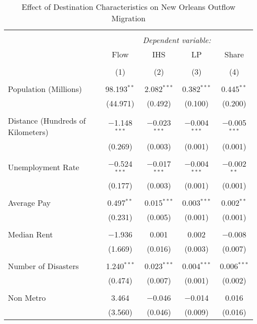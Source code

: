 \documentclass[]{article}
\begin{document}
\clearpage

\clearpage
\scriptsize

\begin{table}[!htbp] \centering 
  \caption{\label{reg:regmain}Effect of Destination Characteristics on New Orleans Outflow Migration} 
  \label{} 
\scriptsize 
\begin{tabular}{@{\extracolsep{5pt}}lcccc} 
\\[-1.8ex]\hline 
\hline \\[-1.8ex] 
 & \multicolumn{4}{c}{\textit{Dependent variable:}} \\ 
\cline{2-5} 
 & Flow & IHS & LP & Share \\ 
\\[-1.8ex] & (1) & (2) & (3) & (4)\\ 
\hline \\[-1.8ex] 
 Population (Millions) & 98.193$^{**}$ & 2.082$^{***}$ & 0.382$^{***}$ & 0.445$^{**}$ \\ 
  & (44.971) & (0.492) & (0.100) & (0.200) \\ 
  & & & & \\ 
 Distance (Hundreds of Kilometers) & $-$1.148$^{***}$ & $-$0.023$^{***}$ & $-$0.004$^{***}$ & $-$0.005$^{***}$ \\ 
  & (0.269) & (0.003) & (0.001) & (0.001) \\ 
  & & & & \\ 
 Unemployment Rate & $-$0.524$^{***}$ & $-$0.017$^{***}$ & $-$0.004$^{***}$ & $-$0.002$^{**}$ \\ 
  & (0.177) & (0.003) & (0.001) & (0.001) \\ 
  & & & & \\ 
 Average Pay & 0.497$^{**}$ & 0.015$^{***}$ & 0.003$^{***}$ & 0.002$^{**}$ \\ 
  & (0.231) & (0.005) & (0.001) & (0.001) \\ 
  & & & & \\ 
 Median Rent & $-$1.936 & 0.001 & 0.002 & $-$0.008 \\ 
  & (1.669) & (0.016) & (0.003) & (0.007) \\ 
  & & & & \\ 
 Number of Disasters & 1.240$^{***}$ & 0.023$^{***}$ & 0.004$^{***}$ & 0.006$^{***}$ \\ 
  & (0.474) & (0.007) & (0.001) & (0.002) \\ 
  & & & & \\ 
 Non Metro & 3.464 & $-$0.046 & $-$0.014 & 0.016 \\ 
  & (3.560) & (0.046) & (0.009) & (0.016) \\ 

\end{tabular}
\end{table}
\end{document}
